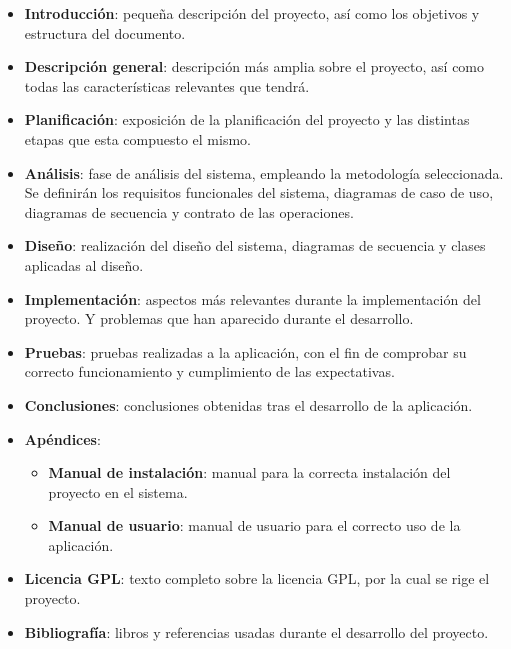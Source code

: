 \begin{itemize}
\item \textbf{Introducción}: pequeña descripción del proyecto, así como los objetivos y estructura del documento.

\item \textbf{Descripción general}: descripción más amplia sobre el proyecto, así como todas las características relevantes
que tendrá.

\item \textbf{Planificación}: exposición de la planificación del proyecto y las distintas etapas que esta compuesto el mismo.

\item \textbf{Análisis}: fase de análisis del sistema, empleando la metodología seleccionada. Se definirán los
requisitos funcionales del sistema, diagramas de caso de uso, diagramas de secuencia y contrato de las operaciones.

\item \textbf{Diseño}: realización del diseño del sistema, diagramas de secuencia y clases aplicadas al diseño.

\item \textbf{Implementación}: aspectos más relevantes durante la implementación del proyecto. Y problemas que han aparecido
durante el desarrollo.

\item \textbf{Pruebas}: pruebas realizadas a la aplicación, con el fin de comprobar su correcto funcionamiento y
cumplimiento de las expectativas.

\item \textbf{Conclusiones}: conclusiones obtenidas tras el desarrollo de la aplicación.

\item \textbf{Apéndices}:
\begin{itemize}
\item \textbf{Manual de instalación}: manual para la correcta instalación del proyecto en el sistema.
\item \textbf{Manual de usuario}: manual de usuario para el correcto uso de la aplicación.
\end{itemize}

\item \textbf{Licencia GPL}: texto completo sobre la licencia GPL, por la cual se rige el proyecto.

\item \textbf{Bibliografía}: libros y referencias usadas durante el desarrollo del proyecto.

\end{itemize}
